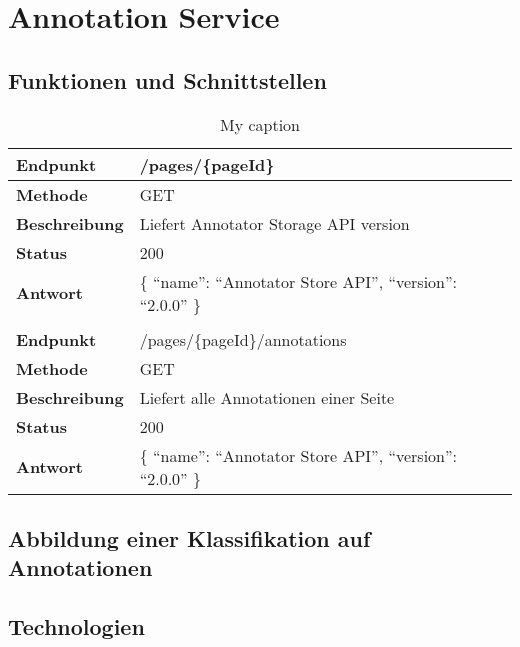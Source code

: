\section{Annotation Service}
    \label{section:solutionDetailsAnnotationService}
    \subsection{Funktionen und Schnittstellen}
        \begin{table}[htb]
            \centering
            \begin{tabular}{|l|l|}
            \hline
            \textbf{Endpunkt}     & /pages/\{pageId\}\\
            \hline
            \textbf{Methode}      & GET\\
            \hline
            \textbf{Beschreibung} & Liefert Annotator Storage API version\\
            \hline
            \textbf{Status}       & 200\\
            \hline
            \textbf{Antwort}      & \{ ``name'': ``Annotator Store API'', ``version'': ``2.0.0'' \}\\
            \hline
            & \\
            \hline
            \textbf{Endpunkt}     & /pages/\{pageId\}/annotations\\
            \hline
            \textbf{Methode}      & GET\\
            \hline
            \textbf{Beschreibung} & Liefert alle Annotationen einer Seite\\
            \hline
            \textbf{Status}       & 200\\
            \hline
            \textbf{Antwort}      & \{ ``name'': ``Annotator Store API'', ``version'': ``2.0.0'' \}\\
            \hline
            \end{tabular}
            \caption{My caption}
            \label{my-label}
        \end{table}


    \subsection{Abbildung einer Klassifikation auf Annotationen}
    \subsection{Technologien}